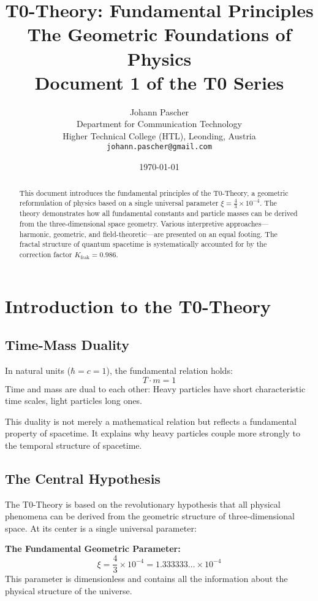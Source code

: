 \documentclass[12pt,a4paper]{article}
\title{\textbf{T0-Theory: Fundamental Principles}\\[0.5cm]
	\large The Geometric Foundations of Physics\\[0.3cm]
	\normalsize Document 1 of the T0 Series}
\author{Johann Pascher\\
	Department for Communication Technology\\
	Higher Technical College (HTL), Leonding, Austria\\
	\texttt{johann.pascher@gmail.com}}
\date{\today}
\newcommand{\xipar}{\xi}
\newcommand{\Kfrak}{K_{\text{frak}}}
\begin{document}
	
	\maketitle
	
	\begin{abstract}
		This document introduces the fundamental principles of the T0-Theory, a geometric reformulation of physics based on a single universal parameter $\xipar = \frac{4}{3} \times 10^{-4}$. The theory demonstrates how all fundamental constants and particle masses can be derived from the three-dimensional space geometry. Various interpretive approaches---harmonic, geometric, and field-theoretic---are presented on an equal footing. The fractal structure of quantum spacetime is systematically accounted for by the correction factor $\Kfrak = 0.986$.
	\end{abstract}
	
	\tableofcontents
	\newpage
	
	\section{Introduction to the T0-Theory}
	\subsection{Time-Mass Duality}
	
	In natural units ($\hbar = c = 1$), the fundamental relation holds:
	\begin{equation}
		T \cdot m = 1
		\label{eq:time_mass_duality}
	\end{equation}
	Time and mass are dual to each other: Heavy particles have short characteristic time scales, light particles long ones.
	
	This duality is not merely a mathematical relation but reflects a fundamental property of spacetime. It explains why heavy particles couple more strongly to the temporal structure of spacetime.
	
	\subsection{The Central Hypothesis}
	
	The T0-Theory is based on the revolutionary hypothesis that all physical phenomena can be derived from the geometric structure of three-dimensional space. At its center is a single universal parameter:
	
	\begin{foundation}
		\textbf{The Fundamental Geometric Parameter:}
		\begin{equation}
			\boxed{\xipar = \frac{4}{3} \times 10^{-4} = 1.333333\dots \times 10^{-4}}
			\label{eq:xi_fundamental}
		\end{equation}
		This parameter is dimensionless and contains all the information about the physical structure of the universe.
	\end{foundation}
	
\end{document}
